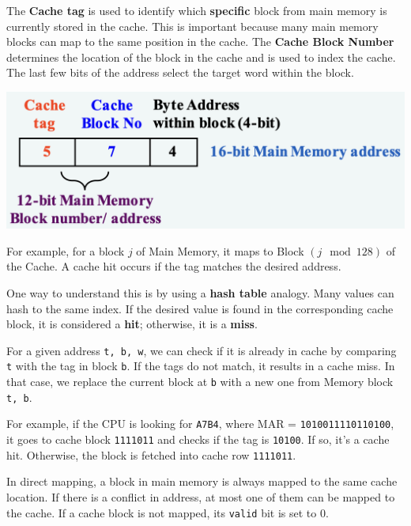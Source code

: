 \begin{minipage}{0.45\textwidth}
The \textbf{Cache tag} is used to identify which \textbf{specific} block from main memory is currently stored in the cache. This is important because many main memory blocks can map to the same position in the cache. The \textbf{Cache Block Number} determines the location of the block in the cache and is used to index the cache. The last few bits of the address select the target word within the block.
\end{minipage}\quad
\begin{minipage}{0.5\textwidth}
  \begin{center}
    \includegraphics[width=\textwidth]{Figure/direct_mapping.png}
  \end{center}
\end{minipage}

For example, for a block \(j\) of Main Memory, it maps to Block \((j \mod 128)\) of the Cache. A cache hit occurs if the tag matches the desired address. 

One way to understand this is by using a \textbf{hash table} analogy. Many values can hash to the same index. If the desired value is found in the corresponding cache block, it is considered a \textbf{hit}; otherwise, it is a \textbf{miss}.

For a given address \verb|t, b, w|, we can check if it is already in cache by comparing \verb|t| with the tag in block \verb|b|. If the tags do not match, it results in a cache miss. In that case, we replace the current block at \verb|b| with a new one from Memory block \verb|t, b|.

For example, if the CPU is looking for \verb|A7B4|, where MAR = \verb|1010011110110100|, it goes to cache block \verb|1111011| and checks if the tag is \verb|10100|. If so, it's a cache hit. Otherwise, the block is fetched into cache row \verb|1111011|.

In direct mapping, a block in main memory is always mapped to the same cache location. If there is a conflict in address, at most one of them can be mapped to the cache. If a cache block is not mapped, its \texttt{valid} bit is set to 0.

